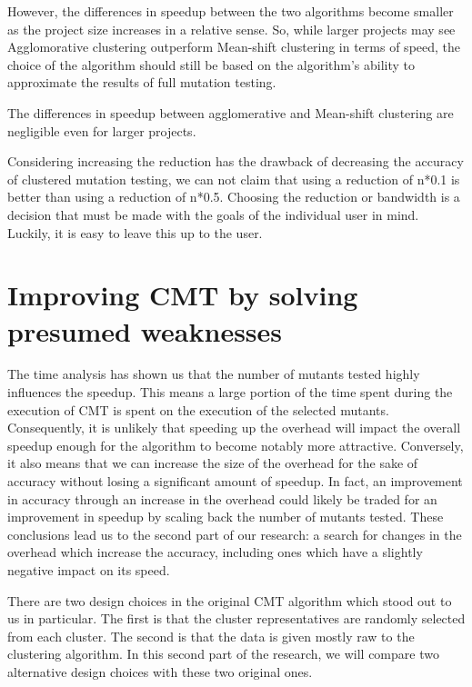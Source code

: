 \documentclass[twoside]{uva-inf-bachelor-thesis}
\begin{document}
However, the differences in speedup between the two algorithms become smaller as the project size increases in a relative sense. So, while larger projects may see Agglomorative clustering outperform Mean-shift clustering in terms of speed, the choice of the algorithm should still be based on the algorithm's ability to approximate the results of full mutation testing.
\begin{hypothesis}
The differences in speedup between agglomerative and Mean-shift clustering are negligible even for larger projects.
\end{hypothesis}

Considering increasing the reduction has the drawback of decreasing the accuracy of clustered mutation testing, we can not claim that using a reduction of n*0.1 is better than using a reduction of n*0.5. Choosing the reduction or bandwidth is a decision that must be made with the goals of the individual user in mind. Luckily, it is easy to leave this up to the user.

\chapter{Improving CMT by solving presumed weaknesses}
\label{chap:4}
The time analysis has shown us that the number of mutants tested highly influences the speedup. This means a large portion of the time spent during the execution of CMT is spent on the execution of the selected mutants. Consequently, it is unlikely that speeding up the overhead will impact the overall speedup enough for the algorithm to become notably more attractive. Conversely, it also means that we can increase the size of the overhead for the sake of accuracy without losing a significant amount of speedup. In fact, an improvement in accuracy through an increase in the overhead could likely be traded for an improvement in speedup by scaling back the number of mutants tested. These conclusions lead us to the second part of our research: a search for changes in the overhead which increase the accuracy, including ones which have a slightly negative impact on its speed.

There are two design choices in the original CMT algorithm which stood out to us in particular. The first is that the cluster representatives are randomly selected from each cluster. The second is that the data is given mostly raw to the clustering algorithm. In this second part of the research, we will compare two alternative design choices with these two original ones.
\end{document}
